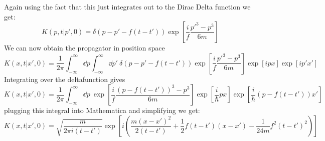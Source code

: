 \documentclass[a4paper,11pt]{article}
\begin{document}
Again using the fact that this just integrates out to the Dirac Delta function we get:
\[
K(p,t|p',0)=\delta (p-p'-f(t-t'))\exp[\frac{i}{f}\frac{p'^3-p^3}{6m}]
\]
We can now obtain the propagator in position space
\[
K(x,t|x',0)=\frac{1}{2\pi}\int^{\infty}_{-\infty}\dd p\int^{\infty}_{-\infty}\dd p'\:\delta (p-p'-f(t-t'))\exp[\frac{i}{ f}\frac{p'^3-p^3}{6m}]\exp[ipx]\exp[ip'x'
]
\]
Integrating over the deltafunction gives
\[
K(x,t|x',0)=\frac{1}{2\pi}\int^{\infty}_{-\infty}\dd p\:\exp[\frac{i}{ f}\frac{(p-f(t-t'))^3-p^3}{6m}]\exp[\frac{i}{\hbar}px]\exp[\frac{i}{\hbar}(p-f(t-t'))x'
]
\]
plugging this integral into Mathematica and simplifying we get:
\[
K(x,t|x',0)=\sqrt{\frac{m}{2\pi i (t-t')}}\exp[i\left( \frac{m(x-x')^2}{2(t-t')}+\frac{1}{2}f(t-t')(x-x')-\frac{1}{24m}f^2(t-t')^2 \right)]
\]
\end{document}
